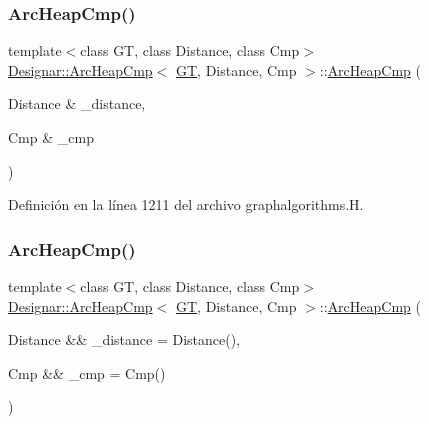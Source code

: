 \subsubsection{\texorpdfstring{Arc\+Heap\+Cmp()}{ArcHeapCmp()}\hspace{0.1cm}{\footnotesize\ttfamily [1/2]}}
{\footnotesize\ttfamily template$<$class GT, class Distance, class Cmp$>$ \\
\hyperlink{class_designar_1_1_arc_heap_cmp}{Designar\+::\+Arc\+Heap\+Cmp}$<$ \hyperlink{demo-buildgraph_8_c_a3001c40d2c31ca87ed96cd7d1334a55e}{GT}, Distance, Cmp $>$\+::\hyperlink{class_designar_1_1_arc_heap_cmp}{Arc\+Heap\+Cmp} (\begin{DoxyParamCaption}\item[{Distance \&}]{\+\_\+distance,  }\item[{Cmp \&}]{\+\_\+cmp }\end{DoxyParamCaption})\hspace{0.3cm}{\ttfamily [inline]}}



Definición en la línea 1211 del archivo graphalgorithms.\+H.

\mbox{\label{class_designar_1_1_arc_heap_cmp_a4a698d49f62f6261afcf3c49e4c09381}} 
\subsubsection{\texorpdfstring{Arc\+Heap\+Cmp()}{ArcHeapCmp()}\hspace{0.1cm}{\footnotesize\ttfamily [2/2]}}
{\footnotesize\ttfamily template$<$class GT, class Distance, class Cmp$>$ \\
\hyperlink{class_designar_1_1_arc_heap_cmp}{Designar\+::\+Arc\+Heap\+Cmp}$<$ \hyperlink{demo-buildgraph_8_c_a3001c40d2c31ca87ed96cd7d1334a55e}{GT}, Distance, Cmp $>$\+::\hyperlink{class_designar_1_1_arc_heap_cmp}{Arc\+Heap\+Cmp} (\begin{DoxyParamCaption}\item[{Distance \&\&}]{\+\_\+distance = {\ttfamily Distance()},  }\item[{Cmp \&\&}]{\+\_\+cmp = {\ttfamily Cmp()} }\end{DoxyParamCaption})\hspace{0.3cm}{\ttfamily [inline]}}



